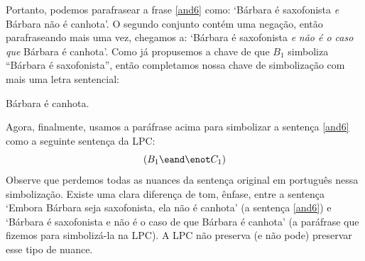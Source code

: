 Portanto, podemos parafrasear a frase \ref{and6} como: `Bárbara é saxofonista \emph{e} Bárbara não é canhota'.
O segundo conjunto contém uma negação, então parafraseando mais uma vez, chegamos a: `Bárbara é saxofonista \emph{e} \emph{não é o caso que} Bárbara é canhota'.
Como já propusemos a chave de que $B_1$ simboliza ``Bárbara é saxofonista'', então completamos nossa chave de simbolização com mais uma letra sentencial:
	\begin{ekey}
		\item[C_1] Bárbara é canhota.
	\end{ekey}
Agora, finalmente, usamos a paráfrase acima para simbolizar a sentença \ref{and6} como a seguinte sentença da LPC:
$$(B_1 \eand \enot C_1)$$
Observe que perdemos todas as nuances da sentença original em português nessa simbolização.
Existe uma clara diferença de tom, ênfase, entre a sentença `Embora Bárbara seja saxofonista, ela não é canhota' (a sentença \ref{and6}) e `Bárbara é saxofonista e não é o caso de que Bárbara é canhota' (a paráfrase que fizemos para simbolizá-la na LPC).
A LPC não preserva (e não pode) preservar esse tipo de nuance.

